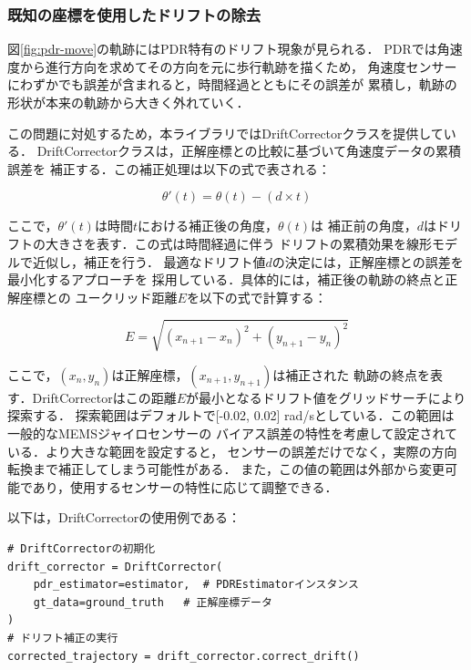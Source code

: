 \subsubsection{既知の座標を使用したドリフトの除去}

図\ref{fig:pdr-move}の軌跡にはPDR特有のドリフト現象が見られる．
PDRでは角速度から進行方向を求めてその方向を元に歩行軌跡を描くため，
角速度センサーにわずかでも誤差が含まれると，時間経過とともにその誤差が
累積し，軌跡の形状が本来の軌跡から大きく外れていく．

この問題に対処するため，本ライブラリではDriftCorrectorクラスを提供している．
DriftCorrectorクラスは，正解座標との比較に基づいて角速度データの累積誤差を
補正する．この補正処理は以下の式で表される：

\begin{equation}
    \theta'(t) = \theta(t) - (d \times t)
\end{equation}

ここで，$\theta'(t)$は時間$t$における補正後の角度，$\theta(t)$は
補正前の角度，$d$はドリフトの大きさを表す．この式は時間経過に伴う
ドリフトの累積効果を線形モデルで近似し，補正を行う．
最適なドリフト値$d$の決定には，正解座標との誤差を最小化するアプローチを
採用している．具体的には，補正後の軌跡の終点と正解座標との
ユークリッド距離$E$を以下の式で計算する：

\begin{equation}
    E = \sqrt{(x_{n+1} - x_n)^2 + (y_{n+1} - y_n)^2}
\end{equation}

ここで，$(x_n, y_n)$は正解座標，$(x_{n+1}, y_{n+1})$は補正された
軌跡の終点を表す．DriftCorrectorはこの距離$E$が最小となるドリフト値をグリッドサーチにより探索する．
探索範囲はデフォルトで[-0.02, 0.02] rad/sとしている．この範囲は一般的なMEMSジャイロセンサーの
バイアス誤差の特性を考慮して設定されている．より大きな範囲を設定すると，
センサーの誤差だけでなく，実際の方向転換まで補正してしまう可能性がある．
また，この値の範囲は外部から変更可能であり，使用するセンサーの特性に応じて調整できる．

以下は，DriftCorrectorの使用例である：
\begin{lstlisting}
# DriftCorrectorの初期化
drift_corrector = DriftCorrector(
    pdr_estimator=estimator,  # PDREstimatorインスタンス
    gt_data=ground_truth   # 正解座標データ
)
# ドリフト補正の実行
corrected_trajectory = drift_corrector.correct_drift()
\end{lstlisting}

